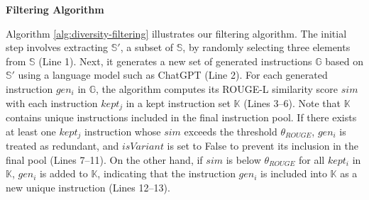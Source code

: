 \begin{comment}
\ours{} adopts an alleviated ROUGE-score-based filtering technique. Self-Instruct takes
only the instructions when its ROUGE-L similarity with any existing instruction
is less than 0.7. As shown in \FIG{fig:api-inefficiency}, with this restriction, almost 50\% of
generations are eliminated; that is, another 50\% of instructions are unnecessary.
We set the ROUGE-L similarity over 0.85 that is, only 20\% instructions, which are
almost the same instructions as existing instructions, are eliminated. However,
simply lowering ROUGE-L similarity restrictions has a negative impact on the diversity
of the task pool.

To train the diverse context of the generated instruction for the target model,
we make each batch have local diversity. Our filtering mechanism aims to optimize
this process by structuring data batches to minimize the need for extensive
filtering.
\end{comment}

\textbf{Filtering Algorithm}
\begin{comment}
\cancel{Algorithm \ref{alg:diversity-filtering} illustrates our filtering algorithm.
The initial step involves selecting a random set of seed instructions ($I_{seed}$)
and generating a new set of instructions ($I_{gen}$) using a language model
such as ChatGPT. For each generated instruction ($gen$), 
the algorithm computes the ROUGE-L similarity with all previously kept instructions ($I_{kept}$).
If the similarity score exceeds the threshold ($\theta_{ROUGE}$),
the instruction is treated as redundant, and the $isVariant$ flag is set to False,
preventing its inclusion. 
Whereas, if the similarity is below the threshold,
the instruction is added to the $I_{kept}$, 
indicating this acceptance into the final pool of instructions. 
This approach reduces the amount of instruction being discarded,
thus minimizing wasted API calls. However, relaxing the threshold to
remove less instructions can negatively impact diversity.
}
\end{comment}
Algorithm \ref{alg:diversity-filtering} illustrates our filtering algorithm.
The initial step involves extracting $\mathbb{S}'$, a subset of
$\mathbb{S}$, by randomly selecting three elements from $\mathbb{S}$ (Line 1).
Next, it generates a new set of generated
instructions $\mathbb{G}$ based on $\mathbb{S}'$ using a language model
such as ChatGPT (Line 2).
For each generated instruction $gen_i$ in $\mathbb{G}$, 
the algorithm computes its ROUGE-L similarity score $sim$ 
with each instruction $kept_j$ in a kept instruction set $\mathbb{K}$ (Lines 3--6). 
Note that $\mathbb{K}$ contains unique instructions included in the final 
instruction pool.
If there exists at least one $kept_j$ instruction whose
$sim$ exceeds the threshold $\theta_{ROUGE}$,
$gen_i$ is treated as redundant, and $isVariant$ is set to False
to prevent its inclusion in the final pool (Lines 7--11).
On the other hand, if $sim$ is below $\theta_{ROUGE}$ for all $kept_i$ in $\mathbb{K}$,
$gen_i$ is added to $\mathbb{K}$, 
indicating that the instruction $gen_i$ is included 
into $\mathbb{K}$ as a new unique instruction (Lines 12--13).

